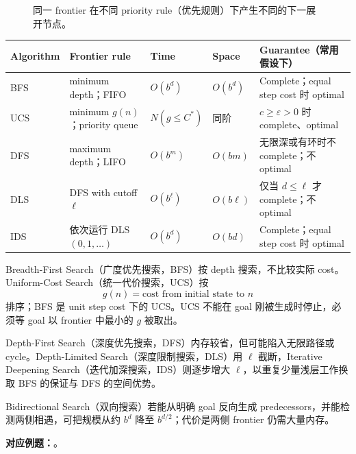 \begin{figure}[htbp]
  \centering
  \resizebox{0.94\textwidth}{!}{}
  \caption{同一 frontier 在不同 priority rule（优先规则）下产生不同的下一展开节点。}
  \label{fig:sc3000-l02-search-priorities}
\end{figure}


\begin{center}
\small
\begin{tabularx}{\textwidth}{@{}>{\raggedright\arraybackslash}p{2.1cm}>{\raggedright\arraybackslash}p{3.1cm}>{\centering\arraybackslash}p{1.7cm}>{\centering\arraybackslash}p{1.7cm}X@{}}
  \toprule
  Algorithm & Frontier rule & Time & Space & Guarantee（常用假设下） \\
  \midrule
  BFS & minimum depth；FIFO & $O(b^d)$ & $O(b^d)$ & Complete；equal step cost 时 optimal \\
  UCS & minimum $g(n)$；priority queue & $N(g\le C^*)$ & 同阶 & $c\ge\varepsilon>0$ 时 complete、optimal \\
  DFS & maximum depth；LIFO & $O(b^m)$ & $O(bm)$ & 无限深或有环时不 complete；不 optimal \\
  DLS & DFS with cutoff $\ell$ & $O(b^\ell)$ & $O(b\ell)$ & 仅当 $d\le\ell$ 才 complete；不 optimal \\
  IDS & 依次运行 DLS$(0,1,\ldots)$ & $O(b^d)$ & $O(bd)$ & Complete；equal step cost 时 optimal \\
  \bottomrule
\end{tabularx}
\end{center}

Breadth-First Search（广度优先搜索，BFS）按 depth 搜索，不比较实际 cost。Uniform-Cost Search（统一代价搜索，UCS）按
\[
  g(n)=\text{cost from initial state to }n
\]
排序；BFS 是 unit step cost 下的 UCS。UCS 不能在 goal 刚被生成时停止，必须等 goal 以 frontier 中最小的 $g$ 被取出。

Depth-First Search（深度优先搜索，DFS）内存较省，但可能陷入无限路径或 cycle。Depth-Limited Search（深度限制搜索，DLS）用 $\ell$ 截断，Iterative Deepening Search（迭代加深搜索，IDS）则逐步增大 $\ell$，以重复少量浅层工作换取 BFS 的保证与 DFS 的空间优势。

Bidirectional Search（双向搜索）若能从明确 goal 反向生成 predecessors，并能检测两侧相遇，可把规模从约 $b^d$ 降至 $b^{d/2}$；代价是两侧 frontier 仍需大量内存。

\textbf{对应例题：}。

